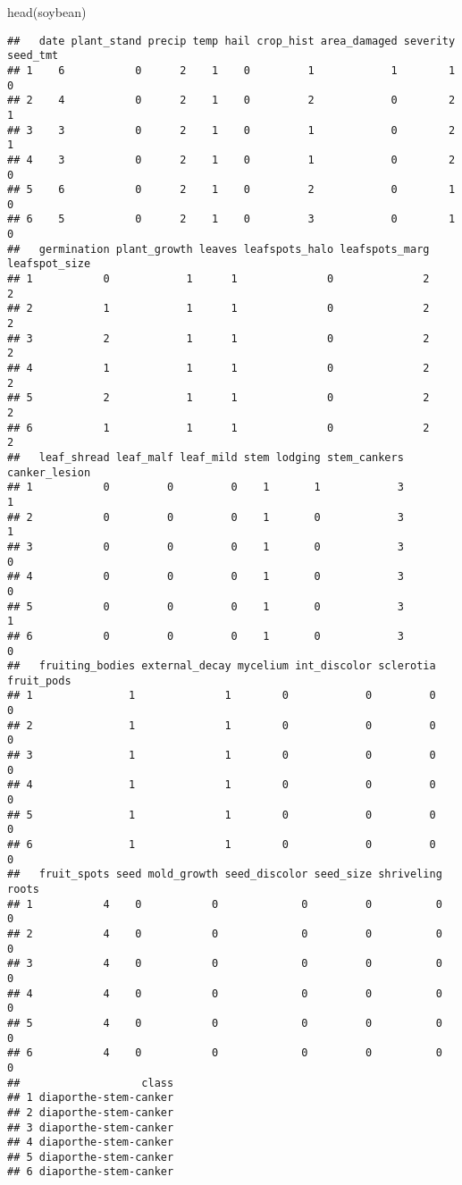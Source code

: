 \documentclass[
]{article}
\newenvironment{Shaded}{\begin{snugshade}}{\end{snugshade}}
\newcommand{\FunctionTok}[1]{\textcolor[rgb]{0.00,0.00,0.00}{#1}}
\newcommand{\NormalTok}[1]{#1}
\begin{document}
\begin{Shaded}
\begin{Highlighting}[]
\FunctionTok{head}\NormalTok{(soybean)}
\end{Highlighting}
\end{Shaded}

\begin{verbatim}
##   date plant_stand precip temp hail crop_hist area_damaged severity seed_tmt
## 1    6           0      2    1    0         1            1        1        0
## 2    4           0      2    1    0         2            0        2        1
## 3    3           0      2    1    0         1            0        2        1
## 4    3           0      2    1    0         1            0        2        0
## 5    6           0      2    1    0         2            0        1        0
## 6    5           0      2    1    0         3            0        1        0
##   germination plant_growth leaves leafspots_halo leafspots_marg leafspot_size
## 1           0            1      1              0              2             2
## 2           1            1      1              0              2             2
## 3           2            1      1              0              2             2
## 4           1            1      1              0              2             2
## 5           2            1      1              0              2             2
## 6           1            1      1              0              2             2
##   leaf_shread leaf_malf leaf_mild stem lodging stem_cankers canker_lesion
## 1           0         0         0    1       1            3             1
## 2           0         0         0    1       0            3             1
## 3           0         0         0    1       0            3             0
## 4           0         0         0    1       0            3             0
## 5           0         0         0    1       0            3             1
## 6           0         0         0    1       0            3             0
##   fruiting_bodies external_decay mycelium int_discolor sclerotia fruit_pods
## 1               1              1        0            0         0          0
## 2               1              1        0            0         0          0
## 3               1              1        0            0         0          0
## 4               1              1        0            0         0          0
## 5               1              1        0            0         0          0
## 6               1              1        0            0         0          0
##   fruit_spots seed mold_growth seed_discolor seed_size shriveling roots
## 1           4    0           0             0         0          0     0
## 2           4    0           0             0         0          0     0
## 3           4    0           0             0         0          0     0
## 4           4    0           0             0         0          0     0
## 5           4    0           0             0         0          0     0
## 6           4    0           0             0         0          0     0
##                   class
## 1 diaporthe-stem-canker
## 2 diaporthe-stem-canker
## 3 diaporthe-stem-canker
## 4 diaporthe-stem-canker
## 5 diaporthe-stem-canker
## 6 diaporthe-stem-canker
\end{verbatim}
\end{document}
